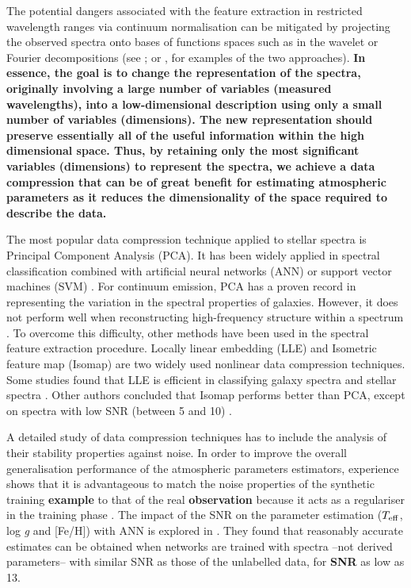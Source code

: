 \documentclass[a4paper,fleqn,usenatbib]{mnras}
\begin{document}
The potential dangers associated with the feature extraction in
restricted wavelength ranges via continuum normalisation can be
mitigated by projecting the observed spectra onto bases of functions
spaces such as in the wavelet or Fourier decompositions 
(see \citealt{2010PASP..122..608M,2015MNRAS.452.1394L}; or 
\citealt{2015ApJS..218....3L}, for examples of the two approaches).
{\bf In essence, the goal is to change the representation of the spectra,
originally involving a large number of variables (measured wavelengths),
into a low-dimensional description using only a small number of 
variables (dimensions). The new representation should preserve essentially 
all of the useful information within the high dimensional space.
Thus, by retaining only the most significant variables (dimensions) 
to represent the spectra, we achieve a data compression that can be 
of great benefit for estimating atmospheric parameters as it reduces 
the dimensionality of the space required to describe the data.}

The most popular data compression technique applied to stellar
spectra is Principal Component Analysis (PCA). It has been widely
applied in spectral classification combined with artificial neural
networks (ANN) \citep{singh:98} or support vector machines (SVM)
\citep{fiorentin:08b}. For continuum emission, PCA has a proven record
in representing the variation in the spectral properties of
galaxies. However, it does not perform well when reconstructing
high-frequency structure within a spectrum \citep{vanderplas:09}. To
overcome this difficulty, other methods have been used in the spectral
feature extraction procedure. Locally linear embedding (LLE)
\citep{roweisLLE:00} and Isometric feature map (Isomap)
\citep{tenenbaum:00} are two widely used nonlinear data
compression techniques. Some studies found that LLE is efficient in
classifying galaxy spectra \citep{vanderplas:09} and stellar spectra
\citep{daniel:11}. Other authors concluded that Isomap performs better
than PCA, except on spectra with low SNR (between 5 and 10)
\citep{bu:14}.

A detailed study of data compression techniques has to include the
analysis of their stability properties against noise. In order to
improve the overall generalisation performance of the atmospheric
parameters estimators, experience shows that it is advantageous to
match the noise properties of the synthetic training {\bf example} to that of
the real {\bf observation} because it acts as a regulariser in the training phase
\citep{fiorentin:08a}.  The impact of the SNR on the parameter
estimation ($T_{\rm eff}$, log \textit{g} and [Fe/H]) with ANN 
is explored in \cite{snider:01}. They found
that reasonably accurate estimates can be obtained when networks are
trained with spectra --not derived parameters-- with similar SNR as
those of the unlabelled data, for {\bf SNR} as low as 13.
\end{document}
